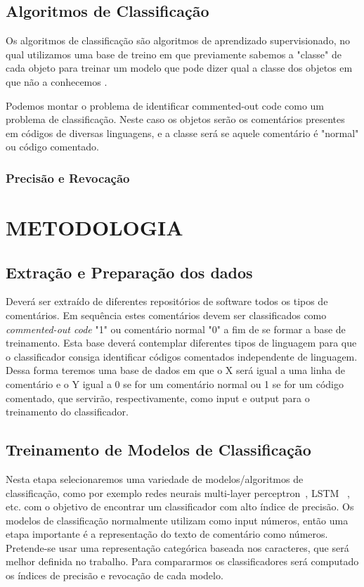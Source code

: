\documentclass{abnt}
\begin{document}
\section{Algoritmos de Classificação}
Os algoritmos de classificação são algoritmos de aprendizado supervisionado,
no qual utilizamos uma base de treino em que previamente sabemos a "classe" 
de cada objeto para treinar um modelo que pode dizer qual a classe dos 
objetos em que não a conhecemos \cite{patternClassification}.

Podemos montar o problema de identificar commented-out code como um problema
de classificação. Neste caso os objetos serão os comentários presentes em 
códigos de diversas linguagens, e a classe será se aquele comentário é "normal"
ou código comentado.

\subsection{Precisão e Revocação}


\chapter{METODOLOGIA}

\section{Extração e Preparação dos dados}

Deverá ser extraído de diferentes repositórios de software todos os tipos
de comentários. Em sequência estes comentários devem ser classificados 
como \textit{commented-out code} "1" ou comentário normal "0" a fim de se formar 
a base de treinamento. Esta base deverá contemplar diferentes tipos
de linguagem para que o classificador consiga identificar códigos
comentados independente de linguagem. Dessa forma teremos uma base de dados em que o 
X será igual a uma linha de comentário e o Y igual a 0 se for um comentário 
normal ou 1 se for um código comentado, que servirão, respectivamente, como input 
e output para o treinamento do classificador.

\section{Treinamento de Modelos de Classificação}

Nesta etapa selecionaremos uma variedade de modelos/algoritmos de classificação,
como por exemplo redes neurais multi-layer perceptron~\cite{zurada1992introduction}, 
LSTM~\cite{gers1999learning} , etc. com o objetivo de encontrar um classificador 
com alto índice de precisão. Os modelos de classificação normalmente utilizam como input números, 
então uma etapa importante é a representação do texto de comentário como números.
Pretende-se usar uma representação categórica baseada nos caracteres, que será
melhor definida no trabalho. Para compararmos os classificadores será 
computado os índices de precisão e revocação de cada modelo.
\end{document}
